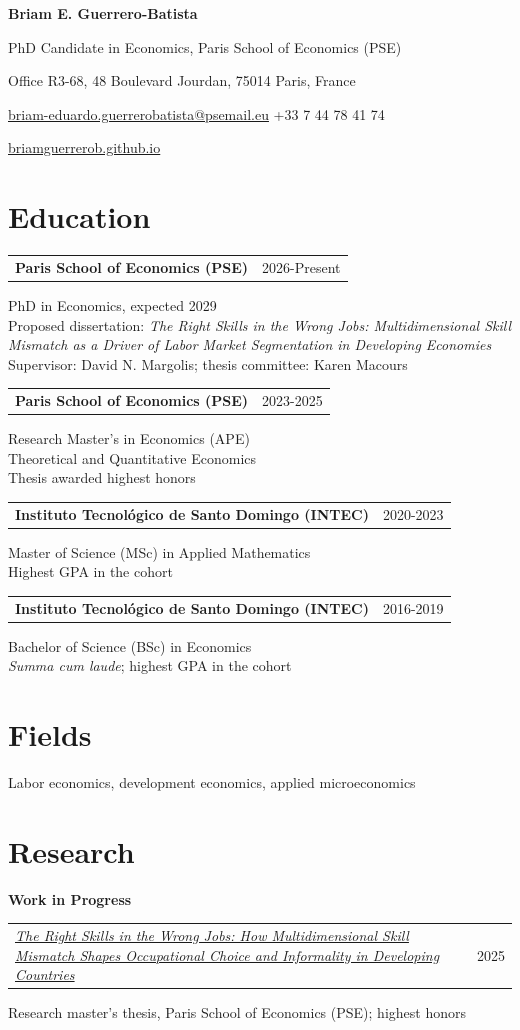 \documentclass[a4paper,11pt]{article}
\makeatletter
\newcommand{\entry}[3]{%
  \begin{minipage}{\linewidth}
  \begin{tabularx}{\linewidth}{@{}>{\raggedright\arraybackslash}X@{\hspace{12pt}}r@{}}
  \textbf{#1}&{\small #2}\\
  \end{tabularx}\par
  #3\par\end{minipage}\par\vspace{6pt}}
\newcommand{\paper}[3]{%
  \begin{minipage}{\linewidth}
  \begin{tabularx}{\linewidth}{@{}>{\raggedright\arraybackslash}X@{\hspace{12pt}}r@{}}
  #1&{\small #2}\\
  \end{tabularx}\par
  {\small #3}\end{minipage}\par\vspace{6pt}}
\newcommand{\subhead}[1]{{\small\bfseries #1}\par\vspace{3pt}}
\makeatother
\begin{document}
{\LARGE\bfseries Briam E. Guerrero-Batista}\par\vspace{7pt}
PhD Candidate in Economics, Paris School of Economics (PSE)\par\vspace{3pt}
{\small
Office R3-68, 48 Boulevard Jourdan, 75014 Paris, France\par
\href{mailto:briam-eduardo.guerrerobatista@psemail.eu}{briam-eduardo.guerrerobatista@psemail.eu}
\quad +33 7 44 78 41 74\par
\href{https://briamguerrerob.github.io}{briamguerrerob.github.io}\par}

\section{Education}
\entry{Paris School of Economics (PSE)}{2026-Present}{%
PhD in Economics, expected 2029\\
Proposed dissertation: \textit{The Right Skills in the Wrong Jobs: Multidimensional Skill Mismatch as a Driver of Labor Market Segmentation in Developing Economies}\\
Supervisor: David N. Margolis; thesis committee: Karen Macours}
\entry{Paris School of Economics (PSE)}{2023-2025}{%
Research Master's in Economics (APE)\\
Theoretical and Quantitative Economics\\
Thesis awarded highest honors}
\entry{Instituto Tecnol\'ogico de Santo Domingo (INTEC)}{2020-2023}{%
Master of Science (MSc) in Applied Mathematics\\
Highest GPA in the cohort}
\entry{Instituto Tecnol\'ogico de Santo Domingo (INTEC)}{2016-2019}{%
Bachelor of Science (BSc) in Economics\\
\textit{Summa cum laude}; highest GPA in the cohort}

\section{Fields}
Labor economics, development economics, applied microeconomics

\section{Research}
\subhead{Work in Progress}
\paper{\href{https://www.researchgate.net/publication/397175486_The_Right_Skills_in_the_Wrong_Jobs_How_Multidimensional_Skill_Mismatch_Shapes_Occupational_Choice_and_Informality_in_Developing_Countries}{\textit{The Right Skills in the Wrong Jobs: How Multidimensional Skill Mismatch Shapes Occupational Choice and Informality in Developing Countries}}}{2025}{Research master's thesis, Paris School of Economics (PSE); highest honors}
\end{document}
